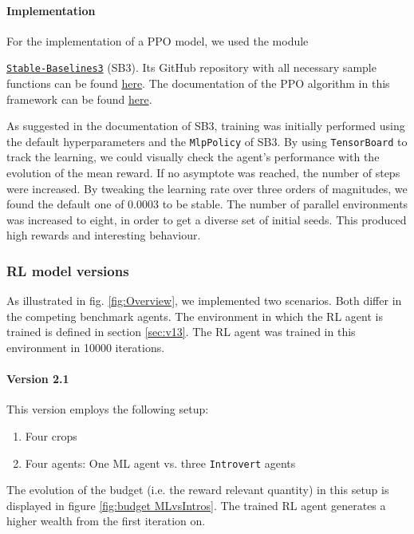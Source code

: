 \documentclass[a4paper,12pt]{article} %
\begin{document}
\paragraph{Implementation}
For the implementation of a PPO model, we used the module 

\href{https://stable-baselines3.readthedocs.io/en/master/index.html}{\texttt{Stable-Baselines3}} (SB3).  Its GitHub repository with all necessary sample functions can be found \href{https://github.com/DLR-RM/stable-baselines3}{here}.
The documentation of the PPO algorithm in this framework can be found \href{https://stable-baselines3.readthedocs.io/en/master/modules/ppo.html}{here}.

As suggested in the documentation of SB3, training was initially performed using the default hyperparameters and the \texttt{MlpPolicy} of SB3. By using \texttt{TensorBoard} to track the learning, we could visually check the agent's performance with the evolution of the mean reward. If no asymptote was reached, the number of steps were increased. By tweaking the learning rate over three orders of magnitudes, we found the default one of 0.0003 to be stable. The number of parallel environments was increased to eight, in order to get a diverse set of initial seeds. This produced high rewards and interesting behaviour.

\newpage

\subsubsection{RL model versions}
As illustrated in fig. \ref{fig:Overview}, we implemented two scenarios. Both differ in the competing benchmark agents. The environment in which the RL agent is trained is defined in section \ref{sec:v13}. The RL agent was trained in this environment in 10000 iterations. 

\paragraph{Version 2.1}
This version employs the following setup:
\begin{enumerate}
    \item Four crops
    \item Four agents: One ML agent vs. three \texttt{Introvert} agents
\end{enumerate}

The evolution of the budget (i.e. the reward relevant quantity) in this setup is displayed in figure \ref{fig:budget MLvsIntros}.
The trained RL agent generates a higher wealth from the first iteration on. 
\end{document}
